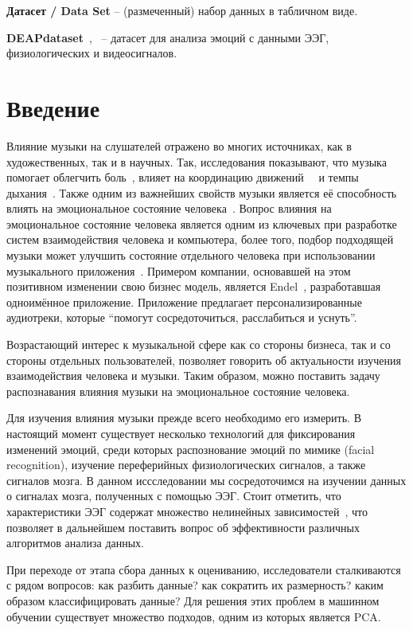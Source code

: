 \documentclass{article}
\begin{document}
\textbf{Датасет / Data Set} -- (размеченный) набор данных в табличном виде.

\textbf{DEAPdataset}~\cite{Koelstra},~\cite{DEAP} -- датасет для анализа эмоций с данными ЭЭГ, физиологических и видеосигналов.


\section{Введение}
Влияние музыки на слушателей отражено во многих источниках, как в художественных, так и в научных. Так, исследования показывают, что музыка помогает облегчить боль~\cite{Newbold}, влияет на координацию движений~\cite{Repp}~\cite{Aschersleben} и темпы дыхания~\cite{Siwiak}. Также одним из важнейших свойств музыки является её способность влиять на эмоциональное состояние человека~\cite{Koelsch}. Вопрос влияния на эмоциональное состояние человека является одним из ключевых при разработке систем взаимодействия человека и компьютера, более того, подбор подходящей музыки может улучшить состояние отдельного человека при использовании музыкального приложения~\cite{Leslie}. Примером компании, основавшей на этом позитивном изменении свою бизнес модель, является Endel~\cite{Endel}, разработавшая одноимённое приложение. Приложение предлагает персонализированные аудиотреки, которые ``помогут сосредоточиться, расслабиться и уснуть''.

Возрастающий интерес к музыкальной сфере как со стороны бизнеса, так и со стороны отдельных пользователей, позволяет говорить об актуальности изучения взаимодействия человека и музыки. Таким образом, можно поставить задачу распознавания влияния музыки на эмоциональное состояние человека. 

Для изучения влияния музыки прежде всего необходимо его измерить. В настоящий момент существует несколько технологий для фиксирования изменений эмоций, среди которых распознование эмоций по мимике (facial recognition), изучение переферийных физиологических сигналов, а также сигналов мозга. В данном иссследовании мы сосредоточимся на изучении данных о сигналах мозга, полученных с помощью ЭЭГ. Стоит отметить, что характеристики ЭЭГ содержат множество нелинейных зависимостей~\cite{Wang}, что позволяет в дальнейшем поставить вопрос об эффективности различных алгоритмов анализа данных. 

При переходе от этапа сбора данных к оцениванию, исследователи сталкиваются с рядом вопросов: как разбить данные? как сократить их размерность? каким образом классифицировать данные? Для решения этих проблем в машинном обучении существует множество подходов, одним из которых является PCA.
\end{document}
